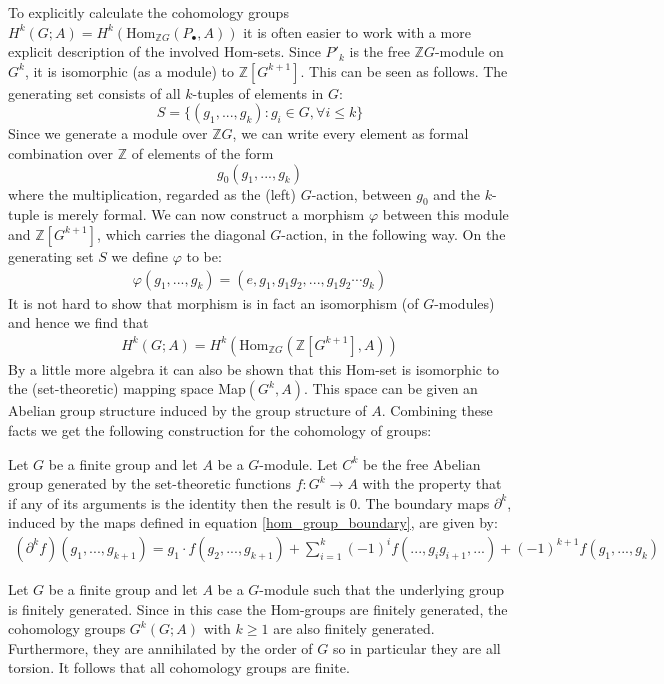 	To explicitly calculate the cohomology groups $H^k(G; A) = H^k(\text{Hom}_{\mathbb{Z}G}(P_\bullet, A))$ it is often easier to work with a more explicit description of the involved Hom-sets. Since $P'_k$ is the free $\mathbb{Z}G$-module on $G^k$, it is isomorphic (as a module) to $\mathbb{Z}[G^{k+1}]$. This can be seen as follows. The generating set consists of all $k$-tuples of elements in $G$: \[S = \{(g_1, ..., g_k): g_i\in G, \forall i\leq k\}\] Since we generate a module over $\mathbb{Z}G$, we can write every element as formal combination over $\mathbb{Z}$ of elements of the form \[g_0(g_1, ..., g_k)\] where the multiplication, regarded as the (left) $G$-action, between $g_0$ and the $k$-tuple is merely formal. We can now construct a morphism $\varphi$ between this module and $\mathbb{Z}[G^{k+1}]$, which carries the diagonal $G$-action, in the following way. On the generating set $S$ we define $\varphi$ to be:
	\begin{gather}
		\varphi(g_1, ..., g_k) = (e, g_1, g_1g_2, ..., g_1g_2\cdots g_k)
	\end{gather}
	It is not hard to show that morphism is in fact an isomorphism (of $G$-modules) and hence we find that
	\begin{gather}
		H^k(G; A) = H^k(\text{Hom}_{\mathbb{Z}G}(\mathbb{Z}[G^{k+1}], A))
	\end{gather}
	By a little more algebra it can also be shown that this Hom-set is isomorphic to the (set-theoretic) mapping space Map$(G^k, A)$. This space can be given an Abelian group structure induced by the group structure of $A$. Combining these facts we get the following construction for the cohomology of groups:
	\begin{construct}
		Let $G$ be a finite group and let $A$ be a $G$-module. Let $C^k$ be the free Abelian group generated by the set-theoretic functions $f:G^k\rightarrow A$ with the property that if any of its arguments is the identity then the result is 0. The boundary maps $\partial^k$, induced by the maps defined in equation \ref{hom_group_boundary}, are given by:
		\begin{gather}
			(\partial^k f)(g_1, ..., g_{k+1}) = g_1\cdot f(g_2, ..., g_{k+1}) + \sum_{i=1}^k(-1)^if(..., g_ig_{i+1}, ...) + (-1)^{k+1}f(g_1, ..., g_k)
		\end{gather}
	\end{construct}
	
	\begin{property}[Finiteness]
		Let $G$ be a finite group and let $A$ be a $G$-module such that the underlying group is finitely generated. Since in this case the Hom-groups are finitely generated, the cohomology groups $G^k(G; A)$ with $k\geq1$ are also finitely generated. Furthermore, they are annihilated by the order of $G$ so in particular they are all torsion. It follows that all cohomology groups are finite.
	\end{property}

